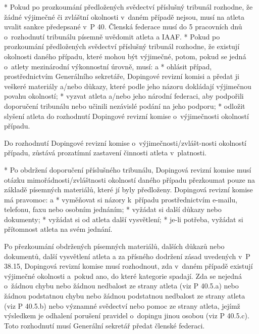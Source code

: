 * Pokud po prozkoumání předložených svědectví příslušný tribunál rozhodne, že žádné výjimečné či zvláštní okolnosti v~daném případě nejsou, musí na atleta uvalit sankce předepsané v~P 40. Členská federace musí do 5 pracovních dnů o~rozhodnutí tribunálu písemně uvědomit atleta a IAAF.
* Pokud po prozkoumání předložených svědectví příslušný tribunál rozhodne, že existují okolnosti daného případu, které mohou být výjimečné, potom, pokud se jedná o~atlety mezinárodní výkonnostní úrovně, musí:
  \begitems \style a
  * ohlásit případ, prostřednictvím Generálního sekretáře, Dopingové revizní komisi a předat ji veškeré materiály a/nebo důkazy, které podle jeho názoru dokládají výjimečnou povahu okolností;
  * vyzvat atleta a/nebo jeho národní federaci, aby podpořili doporučení tribunálu nebo učinili nezávislé podání na jeho podporu;
  * odložit slyšení atleta do rozhodnutí Dopingové revizní komise o~výjimečnosti okolností případu.
  \enditems

Do rozhodnutí Dopingové revizní komise o~výjimečnosti/zvlášt-nosti okolností případu, zůstává prozatímní zastavení činnosti atleta v~platnosti.

* Po obdržení doporučení příslušného tribunálu, Dopingová revizní komise musí otázku mimořádnosti/zvláštnosti okolností daného případu přezkoumat pouze na základě písemných materiálů, které jí byly předloženy. Dopingová revizní komise má pravomoc:
  \begitems \style a
  * vyměňovat si názory k~případu prostřednictvím e-mailu, telefonu, faxu nebo osobním jednáním;
  * vyžádat si další důkazy nebo dokumenty;
  * vyžádat si od atleta další vysvětlení;
  * je-li potřeba, vyžádat si přítomnost atleta na svém jednání.
  \enditems

Po přezkoumání obdržených písemných materiálů, dalších důkazů nebo dokumentů, další vysvětlení atleta a za přísného dodržení zásad uvedených v~P 38.15, Dopingová revizní komise musí rozhodnout, zda v~daném případě existují výjimečné okolnosti a~pokud ano, do které kategorie spadají. Zda se nejedná o~žádnou chybu nebo žádnou nedbalost ze strany atleta (viz P 40.5.a) nebo žádnou podstatnou chybu nebo žádnou podstatnou nedbalost ze strany atleta (viz P 40.5.b) nebo významné svědectví nebo pomoc ze strany atleta, jejímž výsledkem je odhalení porušení pravidel o~dopingu jinou osobou (viz P 40.5.c). Toto rozhodnutí musí Generální sekretář předat členské federaci.

